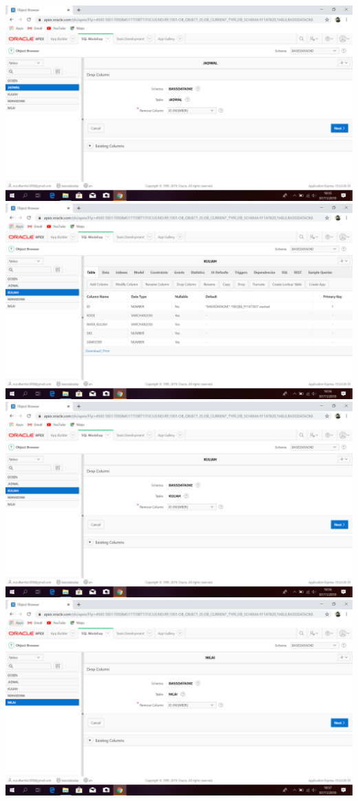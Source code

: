 \documentclass{article}
\begin{document}
\begin{enumerate}
\begin{enumerate}
\begin{center}
    \includegraphics[width=.8\textwidth]{figure/25.PNG}
    \includegraphics[width=.8\textwidth]{figure/26.PNG}
    \includegraphics[width=.8\textwidth]{figure/27.PNG}
    \includegraphics[width=.8\textwidth]{figure/29.PNG}
    \end{center}

\end{enumerate}
\end{enumerate}
\end{document}
